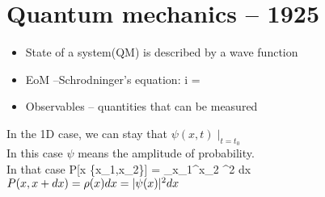 \section{Quantum mechanics -- 1925}

\begin{itemize}
        \item State of a system(QM) is described by a wave function
        \item EoM --Schrodninger's equation: i\hbar {} = \psi
        \item Observables -- quantities that can be measured
        
\end{itemize}



{
    In the 1D case, we can stay that $ \psi(x,t)\mid_{t=t_0}$\\
    In this case $\psi $ means the amplitude of probability.\\
    In that case P[x \in \{x_1,x_2\}] = \int_{x_1}^{x_2} ^2 dx\\
    $P(x,x+dx) = \rho(x)dx = \lvert\psi(x)\rvert^2dx$
}


